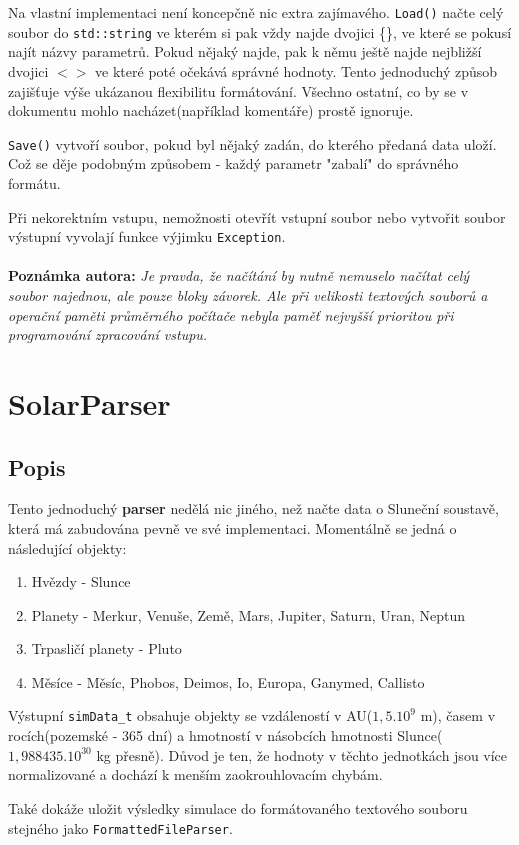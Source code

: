Na vlastní implementaci není koncepčně nic extra zajímavého. \texttt{Load()} načte celý soubor do \texttt{std::string} ve kterém si pak vždy najde dvojici \{\}, ve které se pokusí najít názvy parametrů. Pokud nějaký najde, pak k němu ještě najde nejbližší dvojici $ <> $  ve které poté očekává správné hodnoty. Tento jednoduchý způsob zajišťuje výše ukázanou flexibilitu formátování. Všechno ostatní, co by se v dokumentu mohlo nacházet(například komentáře) prostě ignoruje. 

\texttt{Save()} vytvoří soubor, pokud byl nějaký zadán, do kterého předaná data uloží. Což se děje podobným způsobem - každý parametr "zabalí" do správného formátu.

Při nekorektním vstupu, nemožnosti otevřít vstupní soubor nebo vytvořit soubor výstupní vyvolají funkce výjimku \texttt{Exception}.
\\
\\
\textbf{Poznámka autora:}
\textit{Je pravda, že načítání by nutně nemuselo načítat celý soubor najednou, ale pouze  bloky závorek. Ale při velikosti textových souborů a operační paměti průměrného počítače nebyla paměť nejvyšší prioritou při programování zpracování vstupu.}


\chapter{SolarParser}
\section{Popis}
Tento jednoduchý \textbf{parser} nedělá nic jiného, než načte data o Sluneční soustavě, která má zabudována pevně ve své implementaci.
Momentálně se jedná o následující objekty:
\begin{enumerate}
	\item Hvězdy - Slunce
	\item Planety - Merkur, Venuše, Země, Mars, Jupiter, Saturn, Uran, Neptun
	\item Trpasličí planety - Pluto
	\item Měsíce - Měsíc, Phobos, Deimos, Io, Europa, Ganymed, Callisto
\end{enumerate}
Výstupní \texttt{simData\_t} obsahuje objekty se vzdáleností v AU($ 1,5.10^9 $ m), časem v rocích(pozemské - 365 dní) a hmotností v násobcích hmotnosti Slunce($ 1,988435.10^{30} $ kg přesně). Důvod je ten, že hodnoty v těchto jednotkách jsou více normalizované a dochází k menším zaokrouhlovacím chybám.

Také dokáže uložit výsledky simulace do formátovaného textového souboru stejného jako \texttt{FormattedFileParser}.